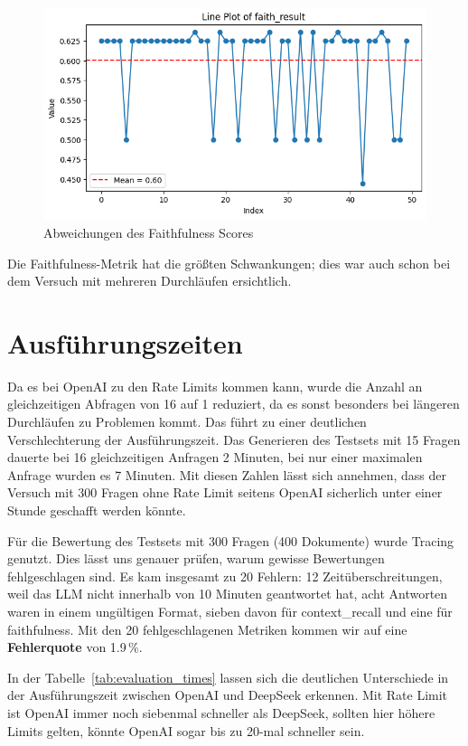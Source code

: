 \begin{figure}[ht!]
    \centering
    \includegraphics[width=1\textwidth]{images/faithfullness.png}
    \caption{Abweichungen des Faithfulness Scores}
    \label{fig:faithfulness_deviation}
\end{figure}

Die Faithfulness-Metrik hat die größten Schwankungen; dies war auch schon bei dem Versuch mit mehreren Durchläufen ersichtlich.

\section{Ausführungszeiten}

Da es bei OpenAI zu den Rate Limits kommen kann, wurde die Anzahl an gleichzeitigen Abfragen von 16 auf 1 reduziert, da es sonst besonders bei längeren Durchläufen zu Problemen kommt.
Das führt zu einer deutlichen Verschlechterung der Ausführungszeit.
Das Generieren des Testsets mit 15 Fragen dauerte bei 16 gleichzeitigen Anfragen 2 Minuten, bei nur einer maximalen Anfrage wurden es 7 Minuten.
Mit diesen Zahlen lässt sich annehmen, dass der Versuch mit 300 Fragen ohne Rate Limit seitens OpenAI sicherlich unter einer Stunde geschafft werden könnte.

Für die Bewertung des Testsets mit 300 Fragen (400 Dokumente) wurde Tracing genutzt.
Dies lässt uns genauer prüfen, warum gewisse Bewertungen fehlgeschlagen sind.
Es kam insgesamt zu 20 Fehlern: 12 Zeitüberschreitungen, weil das LLM nicht innerhalb von 10 Minuten geantwortet hat, acht Antworten waren in einem ungültigen Format, sieben davon für context\_recall und eine für faithfulness.
Mit den 20 fehlgeschlagenen Metriken kommen wir auf eine \textbf{Fehlerquote} von 1.9\,\%.

In der Tabelle~\ref{tab:evaluation_times} lassen sich die deutlichen Unterschiede in der Ausführungszeit zwischen OpenAI und DeepSeek erkennen.
Mit Rate Limit ist OpenAI immer noch siebenmal schneller als DeepSeek, sollten hier höhere Limits gelten, könnte OpenAI sogar bis zu 20-mal schneller sein.

